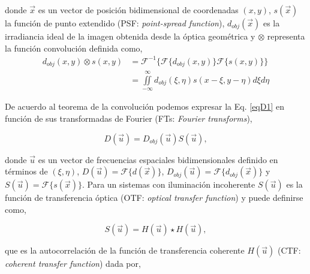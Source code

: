 donde $\vec{x}$ es un vector de posición bidimensional de coordenadas $(x,y)$, $s(\vec{x})$ la función de punto extendido (PSF: \textit{point-spread function}), $d_{obj}(\vec{x})$ es la irradiancia ideal de la imagen obtenida desde la óptica geométrica \cite{Goodman2005} y $\otimes$ representa la función convolución definida como,
\begin{equation}
\label{eqD1a}
\begin{aligned}
	d_{obj}(x,y) \otimes s(x,y) & = \mathscr{F}^{-1}\{ \mathscr{F}\{d_{obj}(x,y)\} \mathscr{F} \{s(x,y)\}\}\\
	& = \iint\limits_{-\infty}^{\infty} d_{obj}(\xi,\eta) s(x-\xi,y-\eta) d\xi d\eta
\end{aligned}
\end{equation}

De acuerdo al teorema de la convolución podemos expresar la Eq. \ref{eqD1} en función de sus transformadas de Fourier (FTs: \textit{Fourier transforms}),


\begin{equation}
\label{eqD2}
	D(\vec{u}) = D_{obj}(\vec{u}) S(\vec{u}),
\end{equation}

donde $\vec{u}$ es un vector de frecuencias espaciales bidimensionales definido en términos de $(\xi , \eta)$, $D(\vec{u}) = \mathscr{F}\{d(\vec{x})\}$, $D_{obj}(\vec{u}) = \mathscr{F} \{d_{obj}(\vec{x})\}$ y $S(\vec{u})=\mathscr{F} \{s(\vec{x})\}$. Para un sistemas con iluminación incoherente $S(\vec{u})$ es la función de transferencia óptica (OTF: \textit{optical transfer function}) \cite{Goodman2005} y puede definirse como,

\begin{equation}
\label{eqD3}
	S(\vec{u}) = H(\vec{u}) \star H(\vec{u}),
\end{equation}

que es la autocorrelación de la función de transferencia coherente $H(\vec{u})$ (CTF: \textit{coherent transfer function}) dada por,

